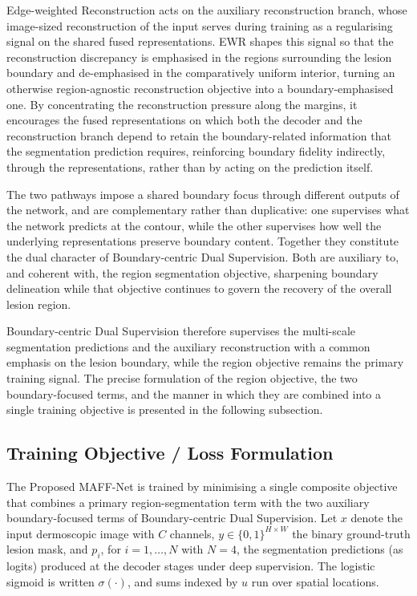 Edge-weighted Reconstruction acts on the auxiliary reconstruction branch, whose image-sized reconstruction of the input serves during training as a regularising signal on the shared fused representations. EWR shapes this signal so that the reconstruction discrepancy is emphasised in the regions surrounding the lesion boundary and de-emphasised in the comparatively uniform interior, turning an otherwise region-agnostic reconstruction objective into a boundary-emphasised one. By concentrating the reconstruction pressure along the margins, it encourages the fused representations on which both the decoder and the reconstruction branch depend to retain the boundary-related information that the segmentation prediction requires, reinforcing boundary fidelity indirectly, through the representations, rather than by acting on the prediction itself.

The two pathways impose a shared boundary focus through different outputs of the network, and are complementary rather than duplicative: one supervises what the network predicts at the contour, while the other supervises how well the underlying representations preserve boundary content. Together they constitute the dual character of Boundary-centric Dual Supervision. Both are auxiliary to, and coherent with, the region segmentation objective, sharpening boundary delineation while that objective continues to govern the recovery of the overall lesion region.

Boundary-centric Dual Supervision therefore supervises the multi-scale segmentation predictions and the auxiliary reconstruction with a common emphasis on the lesion boundary, while the region objective remains the primary training signal. The precise formulation of the region objective, the two boundary-focused terms, and the manner in which they are combined into a single training objective is presented in the following subsection.

\subsection{Training Objective / Loss Formulation}

The Proposed MAFF-Net is trained by minimising a single composite objective that combines a primary region-segmentation term with the two auxiliary boundary-focused terms of Boundary-centric Dual Supervision. Let $x$ denote the input dermoscopic image with $C$ channels, $y \in \{0,1\}^{H \times W}$ the binary ground-truth lesion mask, and $p_i$, for $i = 1,\dots,N$ with $N = 4$, the segmentation predictions (as logits) produced at the decoder stages under deep supervision. The logistic sigmoid is written $\sigma(\cdot)$, and sums indexed by $u$ run over spatial locations.

